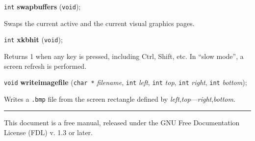 \documentclass[a4paper,11pt]{article}
\newcommand{\V}{\texttt{void}}      %
\newcommand{\I}{\texttt{int}}       %
\newcommand{\C}{\texttt{char *}}    %
\newcommand{\func}[1]{\textbf{#1}}  %
\newcommand{\A}[1]{\emph{#1}}       %
\newcommand{\F}[1]{\texttt{#1}}     %
\newenvironment{bgi}
{ %
  \begin{snugshade}
}
{ %
  \end{snugshade}
}
\begin{document}

\begin{bgi}
\I{} \func{swapbuffers} (\V{});
\end{bgi}

Swaps the current active and the current visual graphics pages.


\begin{bgi}
\I{} \func{xkbhit} (\V{});
\end{bgi}

Returns 1 when any key is pressed, including Ctrl, Shift, etc. In
``slow mode'', a screen refresh is performed.


\begin{bgi}
\V{} \func{writeimagefile} (\C{} \A{filename}, \I{} \A{left}, \I{}
\A{top}, \I{} \A{right}, \I{} \A{bottom});
\end{bgi}

Writes a \F{.bmp} file from the screen rectangle defined by
\A{left},\A{top}---\A{right},\A{bottom}.


\bigskip

\rule{\linewidth}{0.2pt}

This document is a free manual, released under the GNU Free
Documentation License (FDL) v. 1.3 or later.
\end{document}
